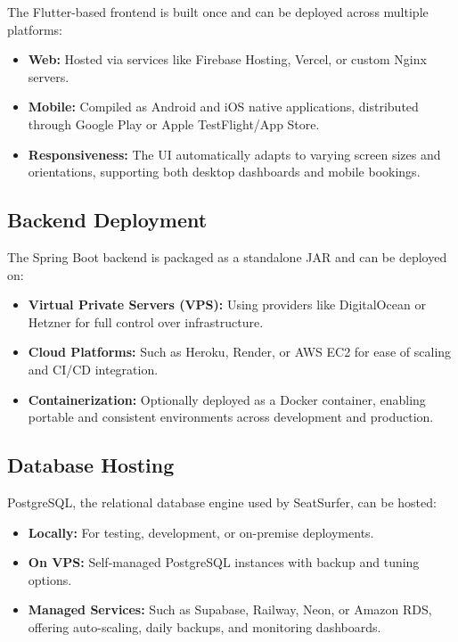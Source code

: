 \documentclass[12pt,a4paper]{report}
\begin{document}
The Flutter-based frontend is built once and can be deployed across multiple platforms:
\begin{itemize}
    \item \textbf{Web:} Hosted via services like Firebase Hosting, Vercel, or custom Nginx servers.
    \item \textbf{Mobile:} Compiled as Android and iOS native applications, distributed through Google Play or Apple TestFlight/App Store.
    \item \textbf{Responsiveness:} The UI automatically adapts to varying screen sizes and orientations, supporting both desktop dashboards and mobile bookings.
\end{itemize}

\subsection*{Backend Deployment}

The Spring Boot backend is packaged as a standalone JAR and can be deployed on:
\begin{itemize}
    \item \textbf{Virtual Private Servers (VPS):} Using providers like DigitalOcean or Hetzner for full control over infrastructure.
    \item \textbf{Cloud Platforms:} Such as Heroku, Render, or AWS EC2 for ease of scaling and CI/CD integration.
    \item \textbf{Containerization:} Optionally deployed as a Docker container, enabling portable and consistent environments across development and production.
\end{itemize}

\subsection*{Database Hosting}

PostgreSQL, the relational database engine used by SeatSurfer, can be hosted:
\begin{itemize}
    \item \textbf{Locally:} For testing, development, or on-premise deployments.
    \item \textbf{On VPS:} Self-managed PostgreSQL instances with backup and tuning options.
    \item \textbf{Managed Services:} Such as Supabase, Railway, Neon, or Amazon RDS, offering auto-scaling, daily backups, and monitoring dashboards.
\end{itemize}
\end{document}
